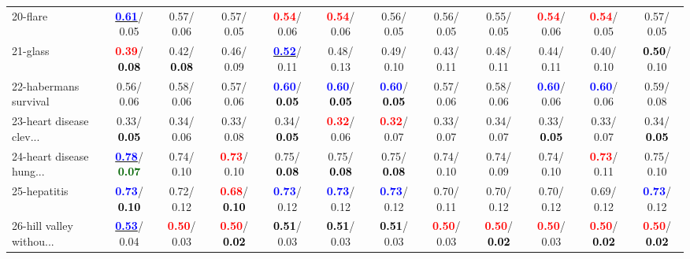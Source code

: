 \begin{table}[h]
\begin{center}
{\begin{tabular}{lc|c|c|c|c|c|c|c|c|c|c}
20-flare & \underline{\textcolor{blue}{\textbf{  0.61}}}/  0.05 &   0.57/  0.06 &   0.57/  0.05 & \textcolor{red}{\textbf{  0.54}}/  0.06 & \textcolor{red}{\textbf{  0.54}}/  0.06 &   0.56/  0.05 &   0.56/  0.05 &   0.55/  0.05 & \textcolor{red}{\textbf{  0.54}}/  0.06 & \textcolor{red}{\textbf{  0.54}}/  0.05 &   0.57/  0.05 \\
21-glass & \textcolor{red}{\textbf{  0.39}}/\textcolor{black}{\textbf{  0.08}} &   0.42/\textcolor{black}{\textbf{  0.08}} &   0.46/  0.09 & \underline{\textcolor{blue}{\textbf{  0.52}}}/  0.11 &   0.48/  0.13 &   0.49/  0.10 &   0.43/  0.11 &   0.48/  0.11 &   0.44/  0.11 &   0.40/  0.10 & \textcolor{black}{\textbf{  0.50}}/  0.10 \\ \hline
22-habermans survival &   0.56/  0.06 &   0.58/  0.06 &   0.57/  0.06 & \textcolor{blue}{\textbf{  0.60}}/\textcolor{black}{\textbf{  0.05}} & \textcolor{blue}{\textbf{  0.60}}/\textcolor{black}{\textbf{  0.05}} & \textcolor{blue}{\textbf{  0.60}}/\textcolor{black}{\textbf{  0.05}} &   0.57/  0.06 &   0.58/  0.06 & \textcolor{blue}{\textbf{  0.60}}/  0.06 & \textcolor{blue}{\textbf{  0.60}}/  0.06 &   0.59/  0.08 \\
23-heart disease clev... &   0.33/\textcolor{black}{\textbf{  0.05}} &   0.34/  0.06 &   0.33/  0.08 &   0.34/\textcolor{black}{\textbf{  0.05}} & \textcolor{red}{\textbf{  0.32}}/  0.06 & \textcolor{red}{\textbf{  0.32}}/  0.07 &   0.33/  0.07 &   0.34/  0.07 &   0.33/\textcolor{black}{\textbf{  0.05}} &   0.33/  0.07 &   0.34/\textcolor{black}{\textbf{  0.05}} \\
24-heart disease hung... & \underline{\textcolor{blue}{\textbf{  0.78}}}/\textcolor{darkgreen}{\textbf{  0.07}} &   0.74/  0.10 & \textcolor{red}{\textbf{  0.73}}/  0.10 &   0.75/\textcolor{black}{\textbf{  0.08}} &   0.75/\textcolor{black}{\textbf{  0.08}} &   0.75/\textcolor{black}{\textbf{  0.08}} &   0.74/  0.10 &   0.74/  0.09 &   0.74/  0.10 & \textcolor{red}{\textbf{  0.73}}/  0.11 &   0.75/  0.10 \\
25-hepatitis & \textcolor{blue}{\textbf{  0.73}}/\textcolor{black}{\textbf{  0.10}} &   0.72/  0.12 & \textcolor{red}{\textbf{  0.68}}/\textcolor{black}{\textbf{  0.10}} & \textcolor{blue}{\textbf{  0.73}}/  0.12 & \textcolor{blue}{\textbf{  0.73}}/  0.12 & \textcolor{blue}{\textbf{  0.73}}/  0.12 &   0.70/  0.11 &   0.70/  0.12 &   0.70/  0.12 &   0.69/  0.12 & \textcolor{blue}{\textbf{  0.73}}/  0.12 \\
26-hill valley withou... & \underline{\textcolor{blue}{\textbf{  0.53}}}/  0.04 & \textcolor{red}{\textbf{  0.50}}/  0.03 & \textcolor{red}{\textbf{  0.50}}/\textcolor{black}{\textbf{  0.02}} & \textcolor{black}{\textbf{  0.51}}/  0.03 & \textcolor{black}{\textbf{  0.51}}/  0.03 & \textcolor{black}{\textbf{  0.51}}/  0.03 & \textcolor{red}{\textbf{  0.50}}/  0.03 & \textcolor{red}{\textbf{  0.50}}/\textcolor{black}{\textbf{  0.02}} & \textcolor{red}{\textbf{  0.50}}/  0.03 & \textcolor{red}{\textbf{  0.50}}/\textcolor{black}{\textbf{  0.02}} & \textcolor{red}{\textbf{  0.50}}/\textcolor{black}{\textbf{  0.02}} \\

\end{tabular}}
\end{center}
\end{table}
